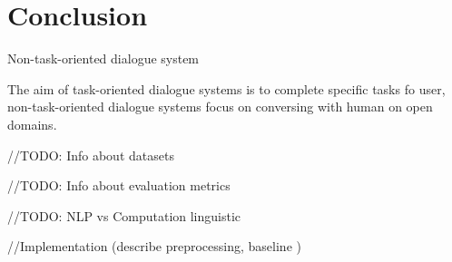 \chapter{Conclusion}

Non-task-oriented dialogue system

The aim of task-oriented dialogue systems is to complete specific tasks fo user, non-task-oriented dialogue systems focus on conversing with human on open domains. 

//TODO: Info about datasets

//TODO: Info about evaluation metrics

//TODO: NLP vs Computation linguistic

//Implementation (describe preprocessing, baseline )
